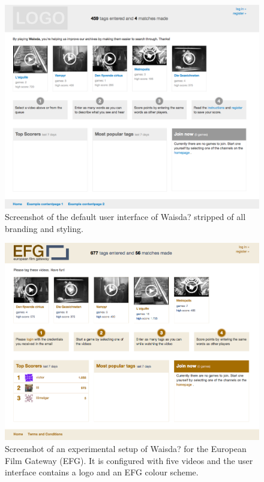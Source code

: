 \begin{figure}[t]
\centering
\includegraphics[width=\columnwidth]{figs/waisdastripped} 
\caption{Screenshot of the default user interface of Waisda? stripped of all branding and styling.}
\label{waisdastripped}
\end{figure}

\begin{figure}[t]
\centering
\includegraphics[width=\columnwidth]{figs/waisdaefgtheme} 
\caption{Screenshot of an experimental setup of Waisda? for the European Film Gateway (EFG). It is configured with five videos and the user interface contains a logo and an EFG colour scheme.}
\label{waisdaefgtheme}
\end{figure}

